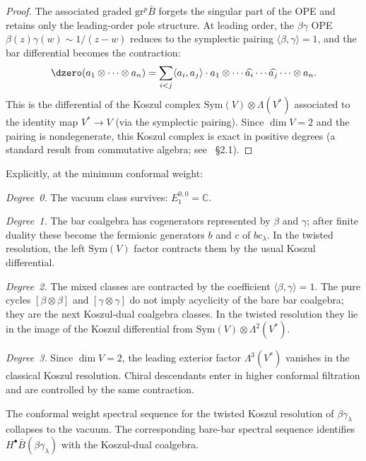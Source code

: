\begin{proof}
The associated graded $\mathrm{gr}^p \bar{B}$ forgets the
singular part of the OPE and retains only the leading-order
pole structure. At leading order, the $\beta\gamma$ OPE
$\beta(z)\gamma(w) \sim 1/(z-w)$ reduces to the symplectic
pairing $\langle \beta, \gamma \rangle = 1$, and the bar
differential becomes the contraction:
\[
\dzero(a_1 \otimes \cdots \otimes a_n)
= \sum_{i < j} \langle a_i, a_j \rangle \cdot
a_1 \otimes \cdots \widehat{a_i} \cdots \widehat{a_j}
\cdots \otimes a_n.
\]
This is the differential of the Koszul complex
$\mathrm{Sym}(V) \otimes \Lambda(V^*)$ associated to the
identity map $V^* \to V$ (via the symplectic pairing). Since
$\dim V = 2$ and the pairing is nondegenerate, this Koszul
complex is exact in positive degrees (a standard result from
commutative algebra; see~\cite{LV12} \S2.1).
\end{proof}

\begin{computation}
\label{comp:betagamma-E1-explicit}
Explicitly, at the minimum conformal weight:

\emph{Degree~0.} The vacuum class survives:
$E_1^{0,0}=\mathbb C$.

\emph{Degree~1.} The bar coalgebra has cogenerators represented by
$\beta$ and $\gamma$; after finite duality these become the fermionic
generators $b$ and $c$ of $bc_\lambda$. In the twisted resolution,
the left $\mathrm{Sym}(V)$ factor contracts them by the usual Koszul
differential.

\emph{Degree~2.} The mixed classes are contracted by the coefficient
$\langle\beta,\gamma\rangle=1$. The pure cycles
$[\beta\otimes\beta]$ and $[\gamma\otimes\gamma]$ do not imply
acyclicity of the bare bar coalgebra; they are the next
Koszul-dual coalgebra classes. In the twisted resolution they lie in
the image of the Koszul differential from
\(\mathrm{Sym}(V)\otimes\Lambda^2(V^*)\).

\emph{Degree~3.} Since $\dim V=2$, the leading exterior factor
$\Lambda^3(V^*)$ vanishes in the classical Koszul resolution. Chiral
descendants enter in higher conformal filtration and are controlled
by the same contraction.
\end{computation}

\begin{proposition}
\label{prop:betagamma-ss-collapse}
The conformal weight spectral sequence for the twisted Koszul
resolution of $\beta\gamma_\lambda$ collapses to the vacuum. The
corresponding bare-bar spectral sequence identifies
$H^\bullet\bar B(\beta\gamma_\lambda)$ with the Koszul-dual
coalgebra.
\end{proposition}

